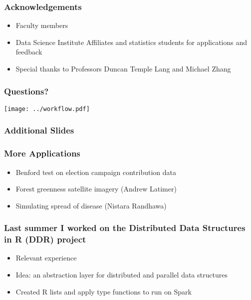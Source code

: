 \documentclass{beamer}
\begin{document}
\begin{frame}

    \frametitle{Acknowledgements}

\begin{itemize}
    \item Faculty members
    \item Data Science Institute Affiliates and statistics students for
        applications and feedback
    \item Special thanks to Professors Duncan Temple Lang and Michael Zhang
\end{itemize}

\end{frame}
\begin{frame}

    \frametitle{Questions?}
    \centerline{\texttt{[image: ../workflow.pdf]}}

\end{frame}
\begin{frame}

    \frametitle{Additional Slides}

\end{frame}
\begin{frame}

    \frametitle{More Applications}


\begin{itemize}
    \item Benford test on election campaign contribution data
    \item Forest greenness satellite imagery (Andrew Latimer)
    \item Simulating spread of disease (Nistara Randhawa)
\end{itemize}

\end{frame}
\begin{frame}

    \frametitle{Last summer I worked on the Distributed Data Structures in
R (DDR) project}


\begin{itemize}
    \item Relevant experience
    \item Idea: an abstraction layer for distributed and parallel data structures
    \item Created R lists and apply type functions to run on Spark
\end{itemize}


\end{frame}
\end{document}
